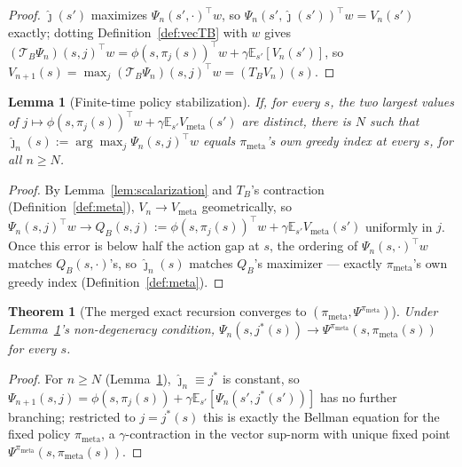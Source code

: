 \documentclass[11pt]{article}
\newtheorem{theorem}{Theorem}
\newtheorem{lemma}{Lemma}
\begin{document}
\begin{proof}
$\hat\jmath(s')$ maximizes $\Psi_n(s',\cdot)^\top w$, so $\Psi_n(s',\hat\jmath(s'))^\top w=V_n(s')$ exactly; dotting
Definition~\ref{def:vecTB} with $w$ gives $(\mathcal T_B\Psi_n)(s,j)^\top w=\phi(s,\pi_j(s))^\top w+\gamma\mathbb
E_{s'}[V_n(s')]$, so $V_{n+1}(s)=\max_j(\mathcal T_B\Psi_n)(s,j)^\top w=(T_BV_n)(s)$.
\end{proof}

\begin{lemma}[Finite-time policy stabilization]\label{lem:stabilize}
If, for every $s$, the two largest values of $j\mapsto\phi(s,\pi_j(s))^\top w+\gamma\mathbb
E_{s'}V_{\mathrm{meta}}(s')$ are distinct, there is $N$ such that $\hat\jmath_n(s):=\arg\max_j\Psi_n(s,j)^\top w$
equals $\pi_{\mathrm{meta}}$'s own greedy index at every $s$, for all $n\ge N$.
\end{lemma}

\begin{proof}
By Lemma~\ref{lem:scalarization} and $T_B$'s contraction (Definition~\ref{def:meta}), $V_n\to V_{\mathrm{meta}}$
geometrically, so $\Psi_n(s,j)^\top w\to Q_B(s,j):=\phi(s,\pi_j(s))^\top w+\gamma\mathbb E_{s'}V_{\mathrm{meta}}(s')$
uniformly in $j$. Once this error is below half the action gap at $s$, the ordering of $\Psi_n(s,\cdot)^\top w$
matches $Q_B(s,\cdot)$'s, so $\hat\jmath_n(s)$ matches $Q_B$'s maximizer — exactly $\pi_{\mathrm{meta}}$'s own greedy
index (Definition~\ref{def:meta}).
\end{proof}

\begin{theorem}[The merged exact recursion converges to $(\pi_{\mathrm{meta}},\Psi^{\pi_{\mathrm{meta}}})$]\label{thm:merged}
Under Lemma~\ref{lem:stabilize}'s non-degeneracy condition, $\Psi_n(s,j^*(s))\to\Psi^{\pi_{\mathrm{meta}}}(s,\pi_{\mathrm{meta}}(s))$ for every $s$.
\end{theorem}

\begin{proof}
For $n\ge N$ (Lemma~\ref{lem:stabilize}), $\hat\jmath_n\equiv j^*$ is constant, so
$\Psi_{n+1}(s,j)=\phi(s,\pi_j(s))+\gamma\mathbb E_{s'}[\Psi_n(s',j^*(s'))]$ has no further branching; restricted to
$j=j^*(s)$ this is exactly the Bellman equation for the fixed policy $\pi_{\mathrm{meta}}$, a $\gamma$-contraction in
the vector sup-norm with unique fixed point $\Psi^{\pi_{\mathrm{meta}}}(s,\pi_{\mathrm{meta}}(s))$.
\end{proof}

\pagebreak 
\end{document}
